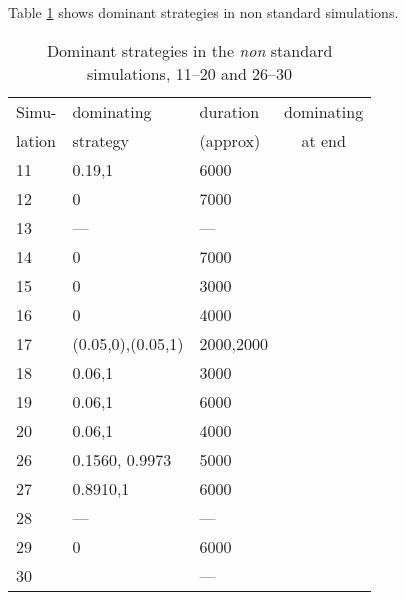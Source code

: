 

Table \ref{tab:results:dominant:11} shows dominant strategies in non standard simulations.

\begin{table}[!hbtp]
  \centering
  \caption{Dominant strategies in the \textit{non} standard simulations, 11--20 and
    26--30}
  \label{tab:results:dominant:11}
  \footnotesize
  \begin{tabular}{lllc}
    Simu-  & dominating & duration  & dominating \\
    lation & strategy   & (approx)  & at end \\
    \hline
11  &  0.19,1              & 6000      \\          
12  &  0                   & 7000               \\ 
13  &  ---                 & ---               \\ 
14  &  0                   & 7000               \\ 
15  &  0                   & 3000               \\ 
16  &  0                   & 4000      \\          
17  &  (0.05,0),(0.05,1)   & 2000,2000 \\          
18  &  0.06,1              & 3000               \\ 
19  &  0.06,1              & 6000      \\          
20  &  0.06,1              & 4000      \\          
26  & 0.1560, 0.9973       & 5000\\          
27  & 0.8910,1             & 6000\\          
28  & ---                  & ---\\ 
29  & 0                    & 6000\\          
30  &                      & ---\\          
    \hline
  \end{tabular}
\end{table}

